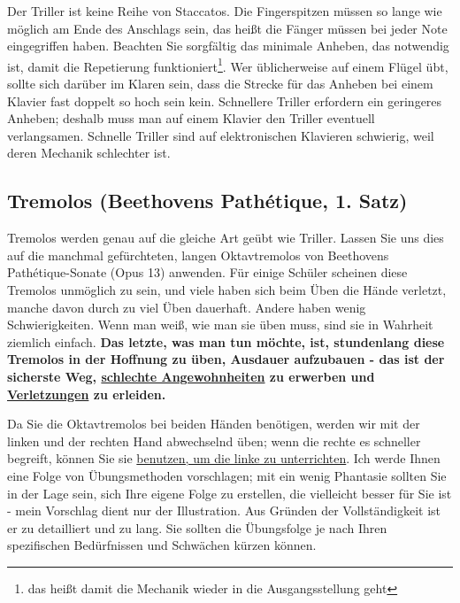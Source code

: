 Der Triller ist keine Reihe von Staccatos.
Die Fingerspitzen müssen so lange wie möglich am Ende des Anschlags sein, das heißt die Fänger müssen bei jeder Note eingegriffen haben.
Beachten Sie sorgfältig das minimale Anheben, das notwendig ist, damit die Repetierung funktioniert\footnote{das heißt damit die Mechanik wieder in die Ausgangsstellung geht}.
Wer üblicherweise auf einem Flügel übt, sollte sich darüber im Klaren sein, dass die Strecke für das Anheben bei einem Klavier fast doppelt so hoch sein kein.
Schnellere Triller erfordern ein geringeres Anheben; deshalb muss man auf einem Klavier den Triller eventuell verlangsamen.
Schnelle Triller sind auf elektronischen Klavieren schwierig, weil deren Mechanik schlechter ist.


\subsection{Tremolos (Beethovens Pathétique, 1. Satz)}\hypertarget{c1iii3b}{}

Tremolos werden genau auf die gleiche Art geübt wie Triller.
Lassen Sie uns dies auf die manchmal gefürchteten, langen Oktavtremolos von Beethovens Pathétique-Sonate (Opus 13) anwenden.
Für einige Schüler scheinen diese Tremolos unmöglich zu sein, und viele haben sich beim Üben die Hände verletzt, manche davon durch zu viel Üben dauerhaft.
Andere haben wenig Schwierigkeiten.
Wenn man weiß, wie man sie üben muss, sind sie in Wahrheit ziemlich einfach.
\textbf{Das letzte, was man tun möchte, ist, stundenlang diese Tremolos in der Hoffnung zu üben, Ausdauer aufzubauen - das ist der sicherste Weg, \hyperlink{c1ii22}{schlechte Angewohnheiten} zu erwerben und \hyperlink{c1iii10hand}{Verletzungen} zu erleiden.}

Da Sie die Oktavtremolos bei beiden Händen benötigen, werden wir mit der linken und der rechten Hand abwechselnd üben; wenn die rechte es schneller begreift, können Sie sie \hyperlink{c1ii20}{benutzen, um die linke zu unterrichten}.
Ich werde Ihnen eine Folge von Übungsmethoden vorschlagen; mit ein wenig Phantasie sollten Sie in der Lage sein, sich Ihre eigene Folge zu erstellen, die vielleicht besser für Sie ist - mein Vorschlag dient nur der Illustration.
Aus Gründen der Vollständigkeit ist er zu detailliert und zu lang.
Sie sollten die Übungsfolge je nach Ihren spezifischen Bedürfnissen und Schwächen kürzen können.

